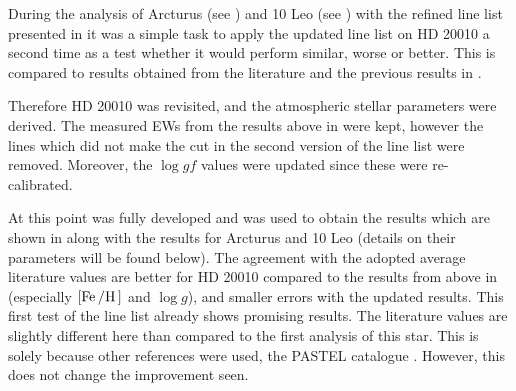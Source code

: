 During the analysis of Arcturus (see ) and 10 Leo (see ) with the
refined line list presented in  it was a simple task to apply the updated
line list on HD 20010 a second time as a test whether it would perform similar, worse or better.
This is compared to results obtained from the literature and the previous results in
.

Therefore HD 20010 was revisited, and the atmospheric stellar parameters were derived. The measured
EWs from the results above in  were kept, however the lines which did not
make the cut in the second version of the line list were removed. Moreover, the $\log \mathit{gf}$
values were updated since these were re-calibrated.

At this point  was fully developed and was used to obtain the results which are shown in
 along with the results for Arcturus and 10 Leo (details on their parameters will
be found below). The agreement with the adopted average literature values are better for HD 20010
compared to the results from above in  (especially $[\ion{Fe}/\ion{H}]$ and
$\log g$), and smaller errors with the updated results. This first test of the line list already
shows promising results. The literature values are slightly different here than compared to the
first analysis of this star. This is solely because other references were used, the PASTEL catalogue
\citep{Soubiran2016}. However, this does not change the improvement seen.


